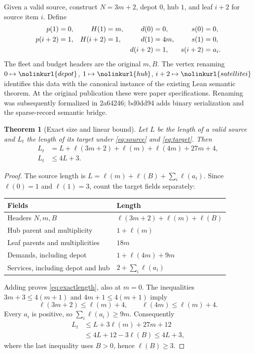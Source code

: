 \documentclass[11pt]{article}
\newtheorem{theorem}[definition]{Theorem}
\theoremstyle{remark}
\newcommand{\code}[1]{\nolinkurl{#1}}
\begin{document}
Given a valid source, construct $N=3m+2$, depot $0$, hub $1$, and leaf $i+2$
for source item $i$. Define
\begin{align}
 p(1)&=0,& H(1)&=m,& d(0)&=0,& s(0)&=0,\notag\\
 p(i+2)&=1,& H(i+2)&=1,& d(1)&=4m,& s(1)&=0,\label{eq:construction}\\
 &&&&d(i+2)&=1,&s(i+2)&=a_i.\notag
\end{align}
The fleet and budget headers are the original $m,B$.
The vertex renaming $0\mapsto\code{depot}$, $1\mapsto\code{hub}$,
$i+2\mapsto\code{satellite i}$ identifies this data with the canonical
instance of the existing Lean semantic theorem. At the original publication these were paper specifications. Renaming was
subsequently formalized in 2a64246; bd0dd94 adds binary serialization and the
sparse-record semantic bridge.

\begin{theorem}[Exact size and linear bound]\label{thm:length}
Let $L$ be the length of a valid source and $L_t$ the length of its target
under \eqref{eq:source} and \eqref{eq:target}. Then
\begin{align}
 L_t&=L+\ell(3m+2)+\ell(m)+\ell(4m)+27m+4,\label{eq:exactlength}\\
 L_t&\le4L+3.\label{eq:linearlength}
\end{align}
\end{theorem}
\begin{proof}
The source length is $L=\ell(m)+\ell(B)+\sum_i\ell(a_i)$.
Since $\ell(0)=1$ and $\ell(1)=3$, count the target fields separately:
\begin{center}
\begin{tabular}{@{}ll@{}}
\toprule Fields & Length\\\midrule
Headers $N,m,B$ & $\ell(3m+2)+\ell(m)+\ell(B)$\\
Hub parent and multiplicity & $1+\ell(m)$\\
Leaf parents and multiplicities & $18m$\\
Demands, including depot & $1+\ell(4m)+9m$\\
Services, including depot and hub & $2+\sum_i\ell(a_i)$\\\bottomrule
\end{tabular}
\end{center}
Adding proves \eqref{eq:exactlength}, also at $m=0$.
The inequalities $3m+3\le4(m+1)$ and $4m+1\le4(m+1)$ imply
\[
 \ell(3m+2)\le\ell(m)+4,\qquad \ell(4m)\le\ell(m)+4.
\]
Every $a_i$ is positive, so $\sum_i\ell(a_i)\ge9m$. Consequently
\[
 \begin{aligned}
 L_t&\le L+3\ell(m)+27m+12\\
    &\le4L+12-3\ell(B)\le4L+3,
 \end{aligned}
\]
where the last inequality uses $B>0$, hence $\ell(B)\ge3$.
\end{proof}
\end{document}
